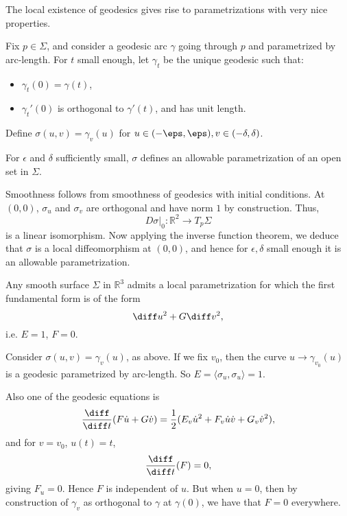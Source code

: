 \documentclass[12pt]{article}
\begin{document}

The local existence of geodesics gives rise to parametrizations with very nice properties.

Fix $p \in \Sigma$, and consider a geodesic arc $\gamma$ going through $p$ and parametrized by arc-length. For $t$ small enough, let $\gamma_t$ be the unique geodesic such that:
\begin{itemize}
	\item $\gamma_t(0) = \gamma(t)$,
	\item $\gamma_t'(0)$ is orthogonal to $\gamma'(t)$, and has unit length.
\end{itemize}
Define $\sigma(u, v) = \gamma_v(u)$ for $u \in (-\eps, \eps), v \in (-\delta, \delta)$.

\begin{lemma}
	For $\epsilon$ and $\delta$ sufficiently small, $\sigma$ defines an allowable parametrization of an open set in $\Sigma$.
\end{lemma}

\begin{proofbox}
	Smoothness follows from smoothness of geodesics with initial conditions. At $(0, 0)$, $\sigma_u$ and $\sigma_v$ are orthogonal and have norm $1$ by construction. Thus,
	\[
	D\sigma|_0 : \mathbb{R}^2 \to T_p\Sigma
	\]
	is a linear isomorphism. Now applying the inverse function theorem, we deduce that $\sigma$ is a local diffeomorphism at $(0, 0)$, and hence for $\epsilon, \delta$ small enough it is an allowable parametrization.
\end{proofbox}

\begin{proposition}
	Any smooth surface $\Sigma$ in $\mathbb{R}^3$ admits a local parametrization for which the first fundamental form is of the form
	\[
	\diff u^2 + G \diff v^2,
	\]
	i.e. $E = 1$, $F = 0$.
\end{proposition}

\begin{proofbox}
	Consider $\sigma(u, v) = \gamma_v(u)$, as above. If we fix $v_0$, then the curve $u \to \gamma_{v_0}(u)$ is a geodesic parametrized by arc-length. So $E = \langle \sigma_u, \sigma_u \rangle = 1$.

	Also one of the geodesic equations is
	\[
	\frac{\diff}{\diff t}(F \dot u + G \dot v) = \frac{1}{2}(E_v \dot u^2 + F_v \dot u \dot v + G_v \dot v^2),
	\]
	and for $v = v_0$, $u(t) = t$,
	\[
	\frac{\diff}{\diff t} (F) = 0,
	\]
	giving $F_u = 0$. Hence $F$ is independent of $u$. But when $u = 0$, then by construction of $\gamma_v$ as orthogonal to $\gamma$ at $\gamma(0)$, we have that $F = 0$ everywhere.
\end{proofbox}
\end{document}
